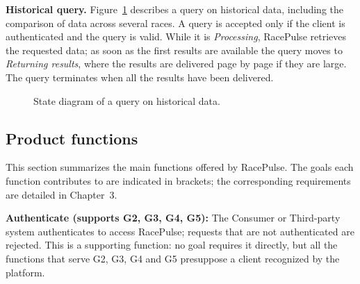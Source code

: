 \documentclass[11pt,a4paper]{article}
\newcommand{\RP}{RacePulse}
\begin{document}
\textbf{Historical query.} Figure~\ref{fig:sd-query} describes a query on historical data, including the comparison
of data across several races. A query is accepted only if the client is authenticated and the query is valid.
While it is \emph{Processing}, \RP{} retrieves the requested data; as soon as the first results are available the
query moves to \emph{Returning results}, where the results are delivered page by page if they are large. The query
terminates when all the results have been delivered.

\begin{figure}[H]
\centering
{}
\caption{State diagram of a query on historical data.}\label{fig:sd-query}
\end{figure}

\FloatBarrier
\subsection{Product functions}
This section summarizes the main functions offered by \RP{}. The goals each function contributes to are
indicated in brackets; the corresponding requirements are detailed in Chapter~3.

\textbf{Authenticate (supports G2, G3, G4, G5):} The Consumer or Third-party system authenticates to access \RP{};
requests that are not authenticated are rejected. This is a supporting function: no goal requires it directly, but
all the functions that serve G2, G3, G4 and G5 presuppose a client recognized by the platform.
\end{document}
